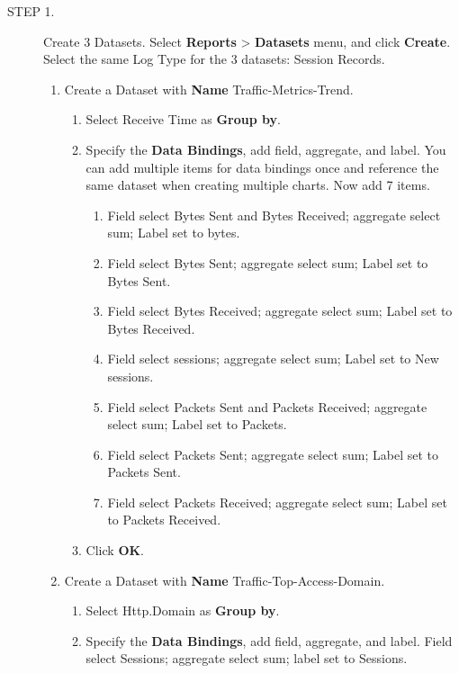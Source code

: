 \begin{description}
    \item[STEP 1.]	Create 3 Datasets. Select \textbf{Reports} > \textbf{Datasets} menu, and click \textbf{Create}. Select the same Log Type for the 3 datasets: Session Records.
    \begin{enumerate}
        \item Create a Dataset with \textbf{Name} Traffic-Metrics-Trend.
        \begin{enumerate}
            \item	Select Receive Time as \textbf{Group by}. 
            \item	Specify the \textbf{Data Bindings}, add field, aggregate, and label. You can add multiple items for data bindings once and reference the same dataset when creating multiple charts. Now add 7 items. 
            \begin{enumerate}
                \item	Field select Bytes Sent and Bytes Received; aggregate select sum; Label set to bytes. 
                \item	Field select Bytes Sent; aggregate select sum; Label set to Bytes Sent. 
                \item	Field select Bytes Received; aggregate select sum; Label set to Bytes Received. 
                \item	Field select sessions; aggregate select sum; Label set to New sessions. 
                \item	Field select Packets Sent and Packets Received; aggregate select sum; Label set to Packets.
                \item	Field select Packets Sent; aggregate select sum; Label set to Packets Sent.
                \item	Field select Packets Received; aggregate select sum; Label set to Packets Received.
            \end{enumerate}
            \item	Click \textbf{OK}.
        \end{enumerate}
        \item Create a Dataset with \textbf{Name} Traffic-Top-Access-Domain.
        \begin{enumerate}
            \item	Select Http.Domain as \textbf{Group by}.
            \item	Specify the \textbf{Data Bindings}, add field, aggregate, and label. Field select Sessions; aggregate select sum; label set to Sessions.

\end{enumerate}
\end{enumerate}
\end{description}
